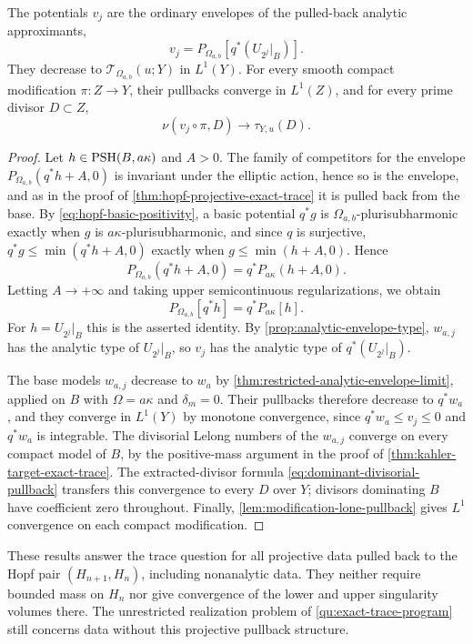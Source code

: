 \begin{proposition}\label{prop:hopf-trace-analytic-approximation}
The potentials $v_j$ are the ordinary envelopes of the pulled-back analytic approximants,
\[
 v_j=P_{\Omega_{a,b}}[q^*(U_{2^j}|_B)].
\]
They decrease to $\mathcal T_{\Omega_{a,b}}(u;Y)$ in $L^1(Y)$. For every smooth compact modification $\pi\colon Z\to Y$, their pullbacks converge in $L^1(Z)$, and for every prime divisor $D\subset Z$,
\[
 \nu(v_j\circ\pi,D)\longrightarrow\tau_{Y,u}(D).
\]
\end{proposition}
\begin{proof}
Let $h\in\mathrm{PSH}(B,a\kappa)$ and $A>0$. The family of competitors for the envelope $P_{\Omega_{a,b}}(q^*h+A,0)$ is invariant under the elliptic action, hence so is the envelope, and as in the proof of \cref{thm:hopf-projective-exact-trace} it is pulled back from the base. By \eqref{eq:hopf-basic-positivity}, a basic potential $q^*g$ is $\Omega_{a,b}$-plurisubharmonic exactly when $g$ is $a\kappa$-plurisubharmonic, and since $q$ is surjective, $q^*g\leq\min(q^*h+A,0)$ exactly when $g\leq\min(h+A,0)$. Hence
\[
 P_{\Omega_{a,b}}(q^*h+A,0)
       =q^*P_{a\kappa}(h+A,0).
\]
Letting $A\to+\infty$ and taking upper semicontinuous regularizations, we obtain
\[
 P_{\Omega_{a,b}}[q^*h]=q^*P_{a\kappa}[h].
\]
For $h=U_{2^j}|_B$ this is the asserted identity. By \cref{prop:analytic-envelope-type}, $w_{a,j}$ has the analytic type of $U_{2^j}|_B$, so $v_j$ has the analytic type of $q^*(U_{2^j}|_B)$.

The base models $w_{a,j}$ decrease to $w_a$ by \cref{thm:restricted-analytic-envelope-limit}, applied on $B$ with $\Omega=a\kappa$ and $\delta_m=0$. Their pullbacks therefore decrease to $q^*w_a$, and they converge in $L^1(Y)$ by monotone convergence, since $q^*w_a\leq v_j\leq0$ and $q^*w_a$ is integrable. The divisorial Lelong numbers of the $w_{a,j}$ converge on every compact model of $B$, by the positive-mass argument in the proof of \cref{thm:kahler-target-exact-trace}. The extracted-divisor formula \eqref{eq:dominant-divisorial-pullback} transfers this convergence to every $D$ over $Y$; divisors dominating $B$ have coefficient zero throughout. Finally, \cref{lem:modification-lone-pullback} gives $L^1$ convergence on each compact modification.
\end{proof}

These results answer the trace question for all projective data pulled back to the Hopf pair $(H_{n+1},H_n)$, including nonanalytic data. They neither require bounded mass on $H_n$ nor give convergence of the lower and upper singularity volumes there. The unrestricted realization problem of \cref{qu:exact-trace-program} still concerns data without this projective pullback structure.
